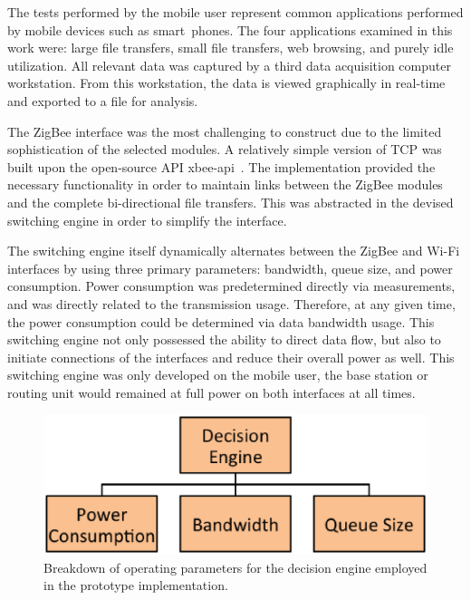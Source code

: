 \documentclass[conference]{IEEEtran}
\begin{document}
The tests performed by the mobile user represent common applications
performed by mobile devices such as smart~phones.  The four
applications examined in this work were: large file transfers, small
file transfers, web browsing, and purely idle utilization.  All
relevant data was captured by a third data acquisition computer
workstation. From this workstation, the data is viewed graphically
in real-time and exported to a file for analysis.

The ZigBee interface was the most challenging to construct due to
the limited sophistication of the selected modules.  A relatively
simple version of TCP was built upon the open-source API
xbee-api~\cite{fifteen}.  The implementation provided the necessary
functionality in order to maintain links between the ZigBee modules
and the complete bi-directional file transfers.  This was abstracted
in the devised switching engine in order to simplify the interface.

The switching engine itself dynamically alternates between the
ZigBee and Wi-Fi interfaces by using three primary parameters:
bandwidth, queue size, and power consumption.  Power consumption was
predetermined directly via measurements, and was directly related to
the transmission usage. Therefore, at any given time, the power
consumption could be determined via data bandwidth usage.  This
switching engine not only possessed the ability to direct data flow,
but also to initiate connections of the interfaces and reduce their
overall power as well.  This switching engine was only developed on
the mobile user, the base station or routing unit would remained at
full power on both interfaces at all times.
\begin{figure}[t]
\begin{center}
\includegraphics[scale=0.40]{cognitive_para.eps}
\caption{Breakdown of operating parameters for the decision engine
employed in the prototype implementation.}
\end{center}
\end{figure}
\end{document}
